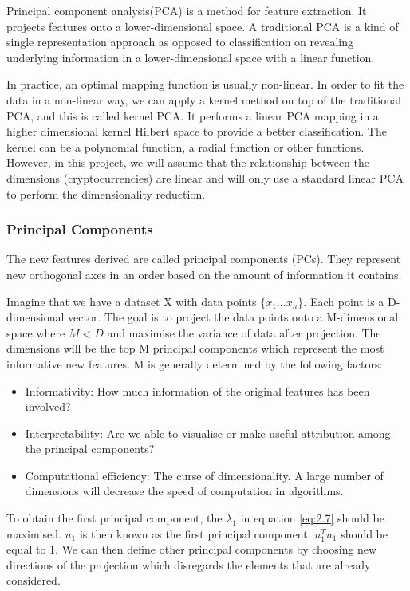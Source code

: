 \documentclass[11pt]{article} %
\theoremstyle{plain}
\theoremstyle{definition}
\begin{document}
Principal component analysis(PCA) is a method for feature extraction. It projects features onto a lower-dimensional space. A traditional PCA is a kind of single representation approach as opposed to classification on revealing underlying information in a lower-dimensional space with a linear function.

In practice, an optimal mapping function is usually non-linear. In order to fit the data in a non-linear way, we can apply a kernel method on top of the traditional PCA, and this is called kernel PCA. It performs a linear PCA mapping in a higher dimensional kernel Hilbert space to provide a better classification. The kernel can be a polynomial function, a radial function or other functions\cite{hessam/kpca:2014}. However, in this project, we will assume that the relationship between the dimensions (cryptocurrencies) are linear and will only use a standard linear PCA to perform the dimensionality reduction.

\subsubsection{Principal Components}

The new features derived are called principal components (PCs). They represent new orthogonal axes in an order based on the amount of information it contains.

Imagine that we have a dataset X with data points $\{{x_1} ... {x_n}\}$. Each point is a D-dimensional vector. The goal is to project the data points onto a M-dimensional space where $M < D$ and maximise the variance of data after projection. The dimensions will be the top M principal components which represent the most informative new features. M is generally determined by the following factors:

\begin{itemize}
  \item Informativity: How much information of the original features has been involved?
  \item Interpretability: Are we able to visualise or make useful attribution among the principal components?
  \item Computational efficiency: The curse of dimensionality. A large number of dimensions will decrease the speed of computation in algorithms.
\end{itemize}

To obtain the first principal component, the $\lambda_{1}$ in equation \eqref{eq:2.7} should be maximised. $u_{1}$ is then known as the first principal component. $u_{1}^{T}u_{1}$ should be equal to 1. We can then define other principal components by choosing new directions of the projection which disregards the elements that are already considered\cite{bishop/praml:2006}.
\end{document}
